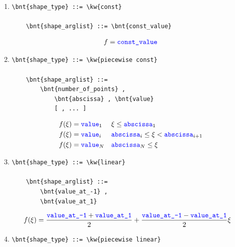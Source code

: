 \begin{enumerate}
    \item {}
\begin{Verbatim}[commandchars=\\\{\}]
    \bnt{shape_type} ::= \kw{const}

    \bnt{shape_arglist} ::= \bnt{const_value}
\end{Verbatim}
\begin{align}
	f = \textcolor{blue}{\texttt{const\_value}}
\end{align}

    \item {}
\begin{Verbatim}[commandchars=\\\{\}]
    \bnt{shape_type} ::= \kw{piecewise const}

    \bnt{shape_arglist} ::=
        \bnt{number_of_points} , 
            \bnt{abscissa} , \bnt{value}
            [ , ... ]
\end{Verbatim}
\begin{subequations}
\begin{align}
	f(\xi) &= \textcolor{blue}{\texttt{value}}_1	&& \xi \le \textcolor{blue}{\texttt{abscissa}}_1
	\\
	f(\xi) &= \textcolor{blue}{\texttt{value}}_i	&& \textcolor{blue}{\texttt{abscissa}}_i \le \xi < \textcolor{blue}{\texttt{abscissa}}_{i+1}
	\\
	f(\xi) &= \textcolor{blue}{\texttt{value}}_N	&& \textcolor{blue}{\texttt{abscissa}}_N \le \xi
\end{align}
\end{subequations}

    \item {}
\begin{Verbatim}[commandchars=\\\{\}]
    \bnt{shape_type} ::= \kw{linear}

    \bnt{shape_arglist} ::=
        \bnt{value_at_-1} , 
        \bnt{value_at_1}
\end{Verbatim}
\begin{align}
	f(\xi) &= \frac{\textcolor{blue}{\texttt{value\_at\_-1}} + \textcolor{blue}{\texttt{value\_at\_1}}}{2}
		+ \frac{\textcolor{blue}{\texttt{value\_at\_-1}} - \textcolor{blue}{\texttt{value\_at\_1}}}{2} \xi
\end{align}

    \item {}
\begin{Verbatim}[commandchars=\\\{\}]
    \bnt{shape_type} ::= \kw{piecewise linear}


\end{Verbatim}
\end{enumerate}
